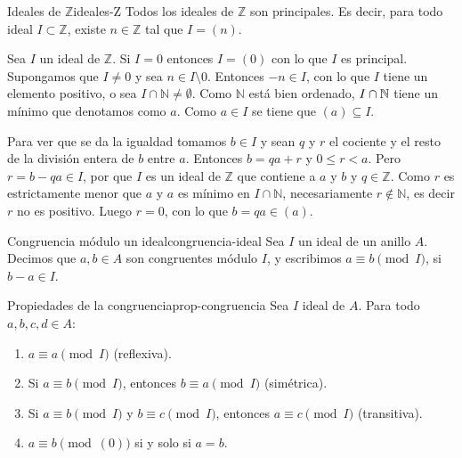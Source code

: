 \begin{proposition}{Ideales de \(\mathbb{Z}\)}{ideales-Z}
    Todos los ideales de \(\mathbb{Z}\) son principales. Es decir, para todo ideal \(I \subset \mathbb{Z}\), existe \(n \in \mathbb{Z}\) tal que \(I = (n)\).
\end{proposition}

\begin{proofbox}
    Sea \(I\) un ideal de \(\mathbb{Z}\). Si \(I=0\) entonces \(I=(0)\) con lo que \(I\) es principal. Supongamos que \(I\neq 0\) y sea \(n\in I\setminus 0\). Entonces \(-n\in I\), con lo que \(I\) tiene un elemento positivo, o sea \(I\cap\mathbb{N}\neq\emptyset\). Como \(\mathbb{N}\) está bien ordenado, \(I \cap \mathbb{N}\) tiene un mínimo que denotamos como \(a\). Como \(a\in I\) se tiene que \((a)\subseteq I\).
    
    Para ver que se da la igualdad tomamos \(b\in I\) y sean \(q\) y \(r\) el cociente y el resto de la división entera de \(b\) entre \(a\). Entonces \(b=qa+r\) y \(0\leq r<a\). Pero \(r=b-qa\in I\), por que \(I\) es un ideal de \(\mathbb{Z}\) que contiene a \(a\) y \(b\) y \(q\in\mathbb{Z}\). Como \(r\) es estrictamente menor que \(a\) y \(a\) es mínimo en \(I\cap\mathbb{N}\), necesariamente \(r\not\in\mathbb{N}\), es decir \(r\) no es positivo. Luego \(r=0\), con lo que \(b=qa\in(a)\).
\end{proofbox}

\begin{definition}{Congruencia módulo un ideal}{congruencia-ideal}
    Sea \(I\) un ideal de un anillo \(A\). Decimos que \(a, b \in A\) son {congruentes módulo \(I\)}, y escribimos \(a \equiv b \pmod{I}\), si \(b - a \in I\).
\end{definition}

\begin{lemma}{Propiedades de la congruencia}{prop-congruencia}
    Sea \(I\) ideal de \(A\). Para todo \(a, b, c, d \in A\):
    \begin{enumerate}
        \item \(a \equiv a \pmod{I}\) (reflexiva).
        \item Si \(a \equiv b \pmod{I}\), entonces \(b \equiv a \pmod{I}\) (simétrica).
        \item Si \(a \equiv b \pmod{I}\) y \(b \equiv c \pmod{I}\), entonces \(a \equiv c \pmod{I}\) (transitiva).
        \item \(a \equiv b \pmod{(0)}\) si y solo si \(a = b\).
    \end{enumerate}
\end{lemma}

